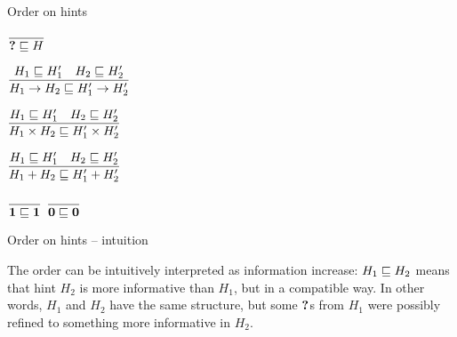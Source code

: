 \documentclass{beamer}
\begin{document}
\begin{frame}{Order on hints}

\begin{center}
  $\displaystyle \frac{}{\textbf{?} \sqsubseteq H} \textsc{\footnotesize{}}$

  \vspace{2em}

  $\displaystyle \frac{H_1 \sqsubseteq H_1' \quad H_2 \sqsubseteq H_2'}{H_1 \to H_2 \sqsubseteq H'_1 \to H'_2} \textsc{\footnotesize{}}$

  \vspace{2em}

  $\displaystyle \frac{H_1 \sqsubseteq H_1' \quad H_2 \sqsubseteq H_2'}{H_1 \times H_2 \sqsubseteq H_1' \times H_2'} \textsc{\footnotesize{}}$

  \vspace{2em}

  $\displaystyle \frac{H_1 \sqsubseteq H_1' \quad H_2 \sqsubseteq H_2'}{H_1 + H_2 \sqsubseteq H_1' + H_2'} \textsc{\footnotesize{}}$

  \vspace{2em}

  $\displaystyle \frac{}{\textbf{1} \sqsubseteq \textbf{1}} \textsc{\footnotesize{}}$ \quad
  $\displaystyle \frac{}{\textbf{0} \sqsubseteq \textbf{0}} \textsc{\footnotesize{}}$
\end{center}

\end{frame}

\begin{frame}{Order on hints -- intuition}

The order can be intuitively interpreted as information increase: $H_1 \sqsubseteq H_2$ means that hint $H_2$ is more informative than $H_1$, but in a compatible way. In other words, $H_1$ and $H_2$ have the same structure, but some $\textbf{?}$s from $H_1$ were possibly refined to something more informative in $H_2$.

\end{frame}
\end{document}
